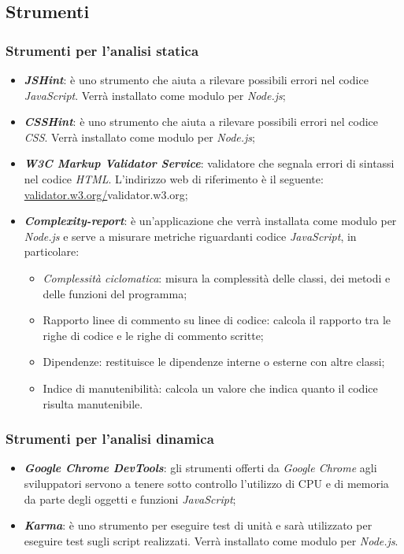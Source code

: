 \subsection{Strumenti}
\subsubsection{Strumenti per l'analisi statica}
\begin{itemize}
  \item \textit{\textbf{JSHint}}: è uno strumento che aiuta a rilevare possibili
  errori nel codice \textit{JavaScript}. Verrà installato come modulo per
  \textit{Node.js};
  \item \textit{\textbf{CSSHint}}: è uno strumento che aiuta a rilevare possibili
  errori nel codice \textit{CSS}. Verrà installato come modulo per
  \textit{Node.js};
  \item \textit{\textbf{W3C Markup Validator Service}}: validatore che segnala
  errori di sintassi nel codice \textit{HTML}. L'indirizzo web di riferimento è
  il seguente: \url{validator.w3.org/}{validator.w3.org};
  \item \textit{\textbf{Complexity-report}}: è un'applicazione che verrà installata come modulo per
  \textit{Node.js} e serve a misurare metriche riguardanti codice \textit{JavaScript}, in particolare:
  \begin{itemize}
    \item \textit{Complessità ciclomatica}: misura la complessità delle classi, dei metodi e delle funzioni del programma;
    \item Rapporto linee di commento su linee di codice: calcola il rapporto tra
    le righe di codice e le righe di commento scritte;
    \item Dipendenze: restituisce le dipendenze interne o esterne con altre
    classi;
    \item Indice di manutenibilità: calcola un valore che indica quanto il
    codice risulta manutenibile.
  \end{itemize}
\end{itemize}
\subsubsection{Strumenti per l'analisi dinamica}
\begin{itemize}
  \item \textit{\textbf{Google Chrome DevTools}}: gli strumenti offerti da \textit{Google Chrome} agli sviluppatori servono a tenere sotto controllo l'utilizzo
  di CPU e di memoria da parte degli oggetti e funzioni \textit{JavaScript};
  \item \textit{\textbf{Karma}}: è uno strumento per eseguire test di unità e sarà utilizzato per eseguire test
  sugli script realizzati. Verrà installato come modulo per \textit{Node.js}.
\end{itemize}

